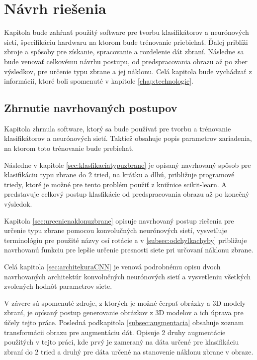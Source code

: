 \chapter{Návrh riešenia}
Kapitola bude zahŕnať použitý software pre tvorbu klasifikátorov a neurónových sietí, špecifikáciu hardwaru na ktorom bude trénovanie priebiehať.
Ďalej priblíži zbroje a spôsoby pre získanie, spracovanie a rozdelenie dát zbraní.
Následne sa bude venovať celkovému návrhu postupu, od predspracovania obrazu až po zber výsledkov, pre určenie typu zbrane a jej náklonu.
Celá kapitola bude vychádzať z informácií, ktoré boli spomenuté v kapitole \ref{chap:technologie}.













\section{Zhrnutie navrhovaných postupov}

Kapitola zhrnula software, ktorý sa bude používať pre tvorbu a trénovanie klasifikátorov a neurónových sietí.
Taktiež obsahuje popis parametrov zariadenia, na ktorom toto trénovanie bude prebiehať.

Následne v kapitole \ref{sec:klasfikaciatypuzbrane} je opísaný navrhovaný spôsob pre klasifikáciu typu zbrane do 2 tried, na krátku a dlhú, približuje
    programové triedy, ktoré je možné pre tento problém použiť z knižnice scikit-learn.
A predstavuje celkový postup klasfikácie od predspracovania obrazu až po konečný výsledok.

Kapitola \ref{sec:urcenienaklonuzbrane} opisuje navrhovaný postup riešenia pre určenie typu zbrane pomocou konvolučných neurónových sietí,
    vysvetľuje terminológiu pre použité názvy osí rotácie a v \ref{subsec:odchylkachyby} približuje navrhovanú funkciu pre lepšie určenie presnosti siete
    pri určovaní náklonu zbrane.

Celá kapitola \ref{sec:architekuraCNN} je venová podrobnému opisu dvoch navrhovaných architektúr konvolučných neurónových sietí a
    vysvetleniu všetkých zvolených hodnôt parametrov siete.

V závere sú spomenuté zdroje, z ktorých je možné čerpať obrázky a 3D modely zbraní, je opísaný postup generovanie obrázkov z 3D modelov a ich úprava
    pre účely tejto práce.
Posledná podkapitola \ref{subsec:augmentacia} obsahuje zoznam transformácii obrazu pre augmentáciu dát.
Opisuje 2 druhy augmentácie použitých v tejto práci, kde prvý je zameraný na dáta určené pre klasifikáciu zbraní do 2 tried a druhý pre dáta
    určené na stanovenie náklonu zbrane v obraze.
